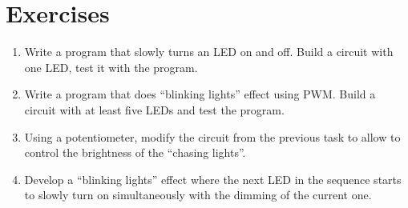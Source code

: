\documentclass[../sparc.tex]{subfiles}
\begin{document}
\section{Exercises}

\begin{enumerate}
\item Write a program that slowly turns an LED on and off.  Build a circuit with
  one LED, test it with the program.
\item Write a program that does ``blinking lights'' effect using PWM.  Build a
  circuit with at least five LEDs and test the program.
\item Using a potentiometer, modify the circuit from the previous task to allow
  to control the brightness of the ``chasing lights''.
\item Develop a ``blinking lights'' effect where the next LED in the sequence
  starts to slowly turn on simultaneously with the dimming of the current one.
\end{enumerate}
\end{document}
